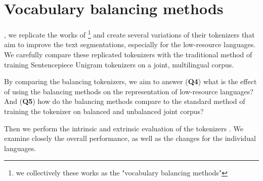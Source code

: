 \chapter{Vocabulary balancing methods}
\label{chap:experiment_3_balancing}



, we replicate the works of \citet{chung_improving_2020,zheng_allocating_2021,liang_xlm-v_2023} \footnote{we collectively  these works as the "vocabulary balancing methods"} and create several variations of their tokenizers that aim to improve the text segmentations, especially for the low-resource languages. 
 We carefully compare these replicated tokenizers with the traditional method of training Sentencepiece Unigram tokenizers on a joint, multilingual corpus.

By comparing the balancing tokenizers, we aim to answer (\textbf{Q4}) what is the effect of using the balancing methods on the representation of low-resource languages? And (\textbf{Q5}) how do the balancing methods compare to the standard method of training the tokenizer on balanced and unbalanced joint corpus?

Then we perform the intrinsic and extrinsic evaluation of the tokenizers . We examine closely the overall performance, as well as the changes for the individual languages.




